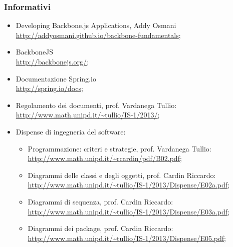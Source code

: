 \subsubsection{Informativi}
\begin{itemize}

\item Developing Backbone.js Applications, Addy Osmani\\
\url{http://addyosmani.github.io/backbone-fundamentals};

\item BackboneJS\\
\url{http://backbonejs.org/};

\item Documentazione Spring.io\\
\url{http://spring.io/docs};

\item Regolamento dei documenti, prof. Vardanega Tullio:\\
\url{http://www.math.unipd.it/~tullio/IS-1/2013/};

\item Dispense di ingegneria del software:
\begin{itemize}
\item Programmazione: criteri e strategie, prof. Vardanega Tullio:\\
\url{http://www.math.unipd.it/~rcardin/pdf/B02.pdf};

\item Diagrammi delle classi e degli oggetti, prof. Cardin Riccardo:\\
\url{http://www.math.unipd.it/~tullio/IS-1/2013/Dispense/E02a.pdf};

\item Diagrammi di sequenza, prof. Cardin Riccardo:\\
\url{http://www.math.unipd.it/~tullio/IS-1/2013/Dispense/E03a.pdf};

\item Diagrammi dei package, prof. Cardin Riccardo:\\
\url{http://www.math.unipd.it/~tullio/IS-1/2013/Dispense/E05.pdf};
\end{itemize}

\end{itemize}